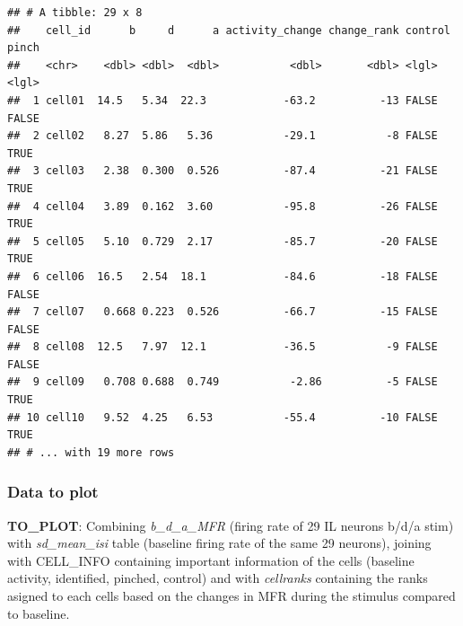 \documentclass[12pt,]{article}
\newenvironment{Shaded}{\begin{snugshade}}{\end{snugshade}}
\newcommand{\DataTypeTok}[1]{\textcolor[rgb]{0.13,0.29,0.53}{#1}}
\newcommand{\DecValTok}[1]{\textcolor[rgb]{0.00,0.00,0.81}{#1}}
\newcommand{\KeywordTok}[1]{\textcolor[rgb]{0.13,0.29,0.53}{\textbf{#1}}}
\newcommand{\NormalTok}[1]{#1}
\newcommand{\OperatorTok}[1]{\textcolor[rgb]{0.81,0.36,0.00}{\textbf{#1}}}
\newcommand{\OtherTok}[1]{\textcolor[rgb]{0.56,0.35,0.01}{#1}}
\newcommand{\StringTok}[1]{\textcolor[rgb]{0.31,0.60,0.02}{#1}}
\begin{document}
\begin{verbatim}
## # A tibble: 29 x 8
##    cell_id      b     d      a activity_change change_rank control pinch
##    <chr>    <dbl> <dbl>  <dbl>           <dbl>       <dbl> <lgl>   <lgl>
##  1 cell01  14.5   5.34  22.3            -63.2          -13 FALSE   FALSE
##  2 cell02   8.27  5.86   5.36           -29.1           -8 FALSE   TRUE 
##  3 cell03   2.38  0.300  0.526          -87.4          -21 FALSE   TRUE 
##  4 cell04   3.89  0.162  3.60           -95.8          -26 FALSE   TRUE 
##  5 cell05   5.10  0.729  2.17           -85.7          -20 FALSE   TRUE 
##  6 cell06  16.5   2.54  18.1            -84.6          -18 FALSE   FALSE
##  7 cell07   0.668 0.223  0.526          -66.7          -15 FALSE   FALSE
##  8 cell08  12.5   7.97  12.1            -36.5           -9 FALSE   FALSE
##  9 cell09   0.708 0.688  0.749           -2.86          -5 FALSE   TRUE 
## 10 cell10   9.52  4.25   6.53           -55.4          -10 FALSE   TRUE 
## # ... with 19 more rows
\end{verbatim}

\hypertarget{data-to-plot}{%
\subsubsection{Data to plot}\label{data-to-plot}}

\textbf{TO\_PLOT}: Combining \emph{b\_d\_a\_MFR} (firing rate of 29 IL
neurons b/d/a stim) with \emph{sd\_mean\_isi} table (baseline firing
rate of the same 29 neurons), joining with CELL\_INFO containing
important information of the cells (baseline activity, identified,
pinched, control) and with \emph{cellranks} containing the ranks asigned
to each cells based on the changes in MFR during the stimulus compared
to baseline.

\begin{Shaded}
\end{Shaded}
\end{document}
